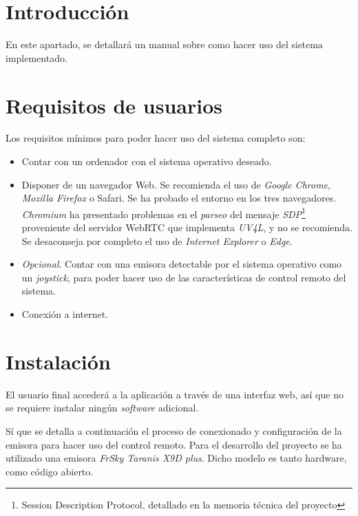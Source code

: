 
\section{Introducción}
En este apartado, se detallará un manual sobre como hacer uso del sistema implementado. 

\section{Requisitos de usuarios}
Los requisitos mínimos para poder hacer uso del sistema completo son:

\begin{itemize}
\item Contar con un ordenador con el sistema operativo deseado.
\item Disponer de un navegador Web. Se recomienda el uso de \emph{Google Chrome}, \emph{Mozilla Firefox} o Safari. Se ha probado el entorno en los tres navegadores. \emph{Chromium} ha presentado problemas en el \emph{parseo} del mensaje \emph{SDP}\footnote{Session Description Protocol, detallado en la memoria técnica del proyecto} proveniente del servidor WebRTC que implementa \emph{UV4L}, y no se recomienda. Se desaconseja por completo el uso de \emph{Internet Explorer} o \emph{Edge}. 
\item \emph{Opcional}. Contar con una emisora detectable por el sistema operativo como un \emph{joystick}, para poder hacer uso de las características de control remoto del sistema.
\item Conexión a internet.
\end{itemize}

\section{Instalación}
\label{sec:instTaranis}
El usuario final accederá a la aplicación a través de una interfaz web, así que no se requiere instalar ningún \emph{software} adicional. 

Sí que se detalla a continuación el proceso de conexionado y configuración de la emisora para hacer uso del control remoto. Para el desarrollo del proyecto se ha utilizado una emisora \emph{FrSky Taranis X9D plus}. Dicho modelo es tanto hardware, como código abierto. 

